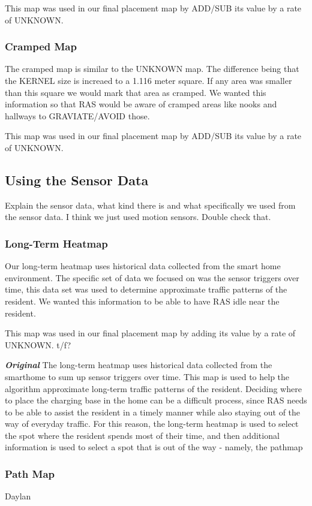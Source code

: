 \documentclass[11pt, conference, a4paper]{IEEEtran}
\begin{document}
This map was used in our final placement map by ADD/SUB its value by a rate of UNKNOWN.


\subsubsection{Cramped Map}
The cramped map is similar to the UNKNOWN map. The difference being that the KERNEL size is increaed to a 1.116 meter square. If any area was smaller than this square we would mark that area as cramped. We wanted this information so that RAS would be aware of cramped areas like nooks and hallways to GRAVIATE/AVOID those. 

This map was used in our final placement map by ADD/SUB its value by a rate of UNKNOWN.


\subsection{Using the Sensor Data}
Explain the sensor data, what kind there is and what specifically we used from the sensor data. I think we just used motion sensors. Double check that. 

\subsubsection{Long-Term Heatmap}
Our long-term heatmap uses historical data collected from the smart home environment. The specific set of data we focused on was the sensor triggers over time, this data set was used to determine approximate traffic patterns of the resident. We wanted this information to be able to have RAS idle near the resident.

This map was used in our final placement map by adding its value by a rate of UNKNOWN. t/f?


\textit{\textbf{Original}} The long-term heatmap uses historical data collected from the smarthome to sum up sensor triggers over time. This map is used to help the algorithm approximate long-term traffic patterns of the resident. Deciding where to place the charging base in the home can be a difficult process, since RAS needs to be able to assist the resident in a timely manner while also staying out of the way of everyday traffic. For this reason, the long-term heatmap is used to select the spot where the resident spends most of their time, and then additional information is used to select a spot that is out of the way - namely, the pathmap


\subsubsection{Path Map}
Daylan
\end{document}
